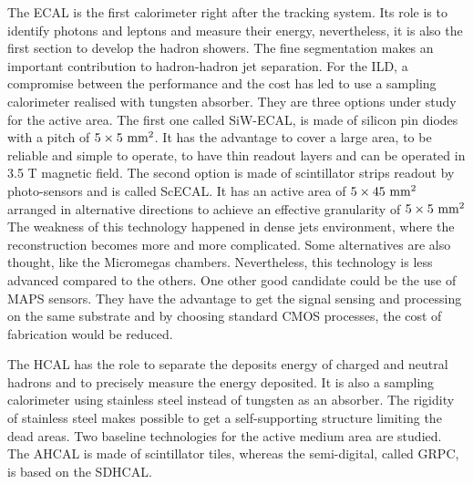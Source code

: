       The \gls{ECAL} is the first calorimeter right after the tracking system.
      Its role is to identify photons and leptons and measure their energy, nevertheless, it is also the first section to develop the hadron showers.
      The fine segmentation makes an important contribution to hadron-hadron jet separation.
      For the \gls{ILD}, a compromise between the performance and the cost has led to use a sampling calorimeter realised with tungsten absorber.
      They are three options under study for the active area.
      The first one called SiW-ECAL, is made of silicon pin diodes with a pitch of $5 \times 5~\rm{mm}^2$. 
      It has the advantage to cover a large area, to be reliable and simple to operate, to have thin readout layers and can be operated in 3.5 T magnetic field.
      The second option is made of scintillator strips readout by photo-sensors and is called ScECAL.
      It has an active area of $5 \times 45~\rm{mm}^2$ arranged in alternative directions to achieve an effective granularity of $5 \times 5~\rm{mm}^2$ 
      The weakness of this technology happened in dense jets environment, where the reconstruction becomes more and more complicated.
      Some alternatives are also thought, like the Micromegas chambers. Nevertheless, this technology is less advanced compared to the others.
      One other good candidate could be the use of \gls{MAPS} sensors.
      They have the advantage to get the signal sensing and processing on the same  substrate and by choosing standard CMOS processes, the cost of fabrication would be reduced.

      The \gls{HCAL} has the role to separate the deposits energy of charged and neutral hadrons and to precisely measure the energy deposited.
      It is also a sampling calorimeter using stainless steel instead of tungsten as an absorber. 
      The rigidity of stainless steel makes possible to get a self-supporting structure limiting the dead areas.
      Two baseline technologies for the active medium area are studied.
      The  \gls{AHCAL} is made of scintillator tiles, whereas the semi-digital, called \gls{GRPC}, is based on the \gls{SDHCAL}.


